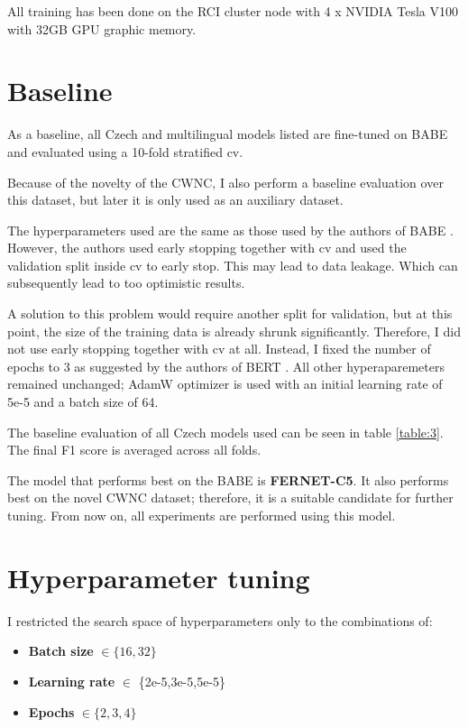 All training has been done on the RCI cluster node with 4 x NVIDIA Tesla V100 with 32GB GPU graphic memory.





 \section{Baseline}
 As a baseline, all Czech and multilingual models listed are fine-tuned on BABE and evaluated using a 10-fold stratified \gls{cv}. 
 
 Because of the novelty of the CWNC, I also perform a baseline evaluation over this dataset, but later it is only used as an auxiliary dataset.
 
 The hyperparameters used are the same as those used by the authors of BABE \cite{Spinde2021MBIC}. However, the authors used early stopping together with \gls{cv} and used the validation split inside \gls{cv} to early stop. This may lead to data leakage. Which can subsequently lead to too optimistic results.
 
 A solution to this problem would require another split for validation, but at this point, the size of the training data is already shrunk significantly. Therefore, I did not use early stopping together with \gls{cv} at all. Instead, I fixed the number of epochs to 3 as suggested by the authors of BERT \cite{devlin2019bert} . 
 All other hyperaparemeters remained unchanged; AdamW optimizer is used with an initial learning rate of 5e-5 and a batch size of 64.
 
 The baseline evaluation of all Czech models used can be seen in table \ref{table:3}. The final F1 score is averaged across all folds.
 
 The model that performs best on the BABE is \textbf{FERNET-C5}. It also performs best on the novel CWNC dataset; therefore, it is a suitable candidate for further tuning. From now on, all experiments are performed using this model.
 

 

 
 
 
 
 \section{Hyperparameter tuning}
I restricted the search space of hyperparameters only to the combinations of:
 \begin{itemize}
     \item \textbf{Batch size} $\in \{16,32\}$
     \item \textbf{Learning rate} $\in $ \{2e-5,3e-5,5e-5\}
     \item \textbf{Epochs} $\in \{2,3,4\}$
 \end{itemize}
 
